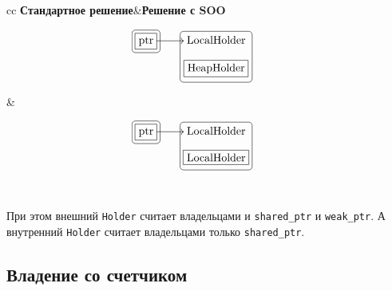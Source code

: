 \begin{center}
\begin{tabular}{cc}
{\textbf{Стандартное решение}}&{\textbf{Решение с SOO}}\\
{
\begin{minipage}[\baselineskip]{6cm}
\[
\xymatrix@R=10pt{
  {\text{ptr}}\ar[r]
    	{
	\save
   [].[]*[F-]\frm{}
   \restore
	}
	    	{
	\save
   [].[]*+[F-:<3pt>]\frm{}
   \restore
	}
  &{\text{LocalHolder}}
      	{
	\save
   [].[d]*+[F-:<3pt>]\frm{}
   \restore
	}
  &{}\\
  {}
  &{\text{HeapHolder}}
      	{
	\save
   [].[]*[F-]\frm{}
   \restore
	}
  &{}\\
}
\]
\end{minipage}
}&{
\begin{minipage}[\baselineskip]{6cm}
\[
\xymatrix@R=10pt{
  {\text{ptr}}\ar[r]
    	{
	\save
   [].[]*[F-]\frm{}
   \restore
	}
	    	{
	\save
   [].[]*+[F-:<3pt>]\frm{}
   \restore
	}
  &{\text{LocalHolder}}
      	{
	\save
   [].[d]*+[F-:<3pt>]\frm{}
   \restore
	}
  &{}\\
  {}
  &{\text{LocalHolder}}
      	{
	\save
   [].[]*[F-]\frm{}
   \restore
	}
  &{}\\
}
\]
\end{minipage}
}\\
\end{tabular}
\end{center}
При этом внешний \verb"Holder" считает владельцами и \verb"shared_ptr" и \verb"weak_ptr".
А внутренний \verb"Holder" считает владельцами только \verb"shared_ptr".

\subsection{Владение со счетчиком}

